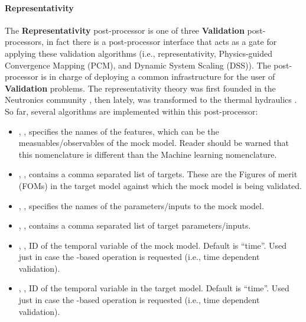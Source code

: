 \paragraph{Representativity}
The \textbf{Representativity} post-processor is one of three \textbf{Validation} post-processors, in fact there is a
post-processor interface that acts as a gate for applying these validation algorithms
(i.e., representativity, Physics-guided Convergence Mapping (PCM), and Dynamic System Scaling (DSS)).
The post-processor is in charge of deploying a common infrastructure for the user of  \textbf{Validation} problems.
The representativity theory was first founded in the
Neutronics community \cite{Gandini, palmiotti1, palmiotti2}, then lately, was transformed to the thermal hydraulics \cite{Epiney1, Epiney2}. So far, several algorithms are implemented within this post-processor:
%
%

\begin{itemize}
  \item {}, , specifies the names of  the features, which can be the measuables/observables of the mock model. Reader should be warned that this nomenclature is different than the Machine learning nomenclature.

  \item {}, , contains a comma separated list of
     targets. These are the Figures of merit (FOMs) in the target model against which the mock model is being validated.

    \item {}, , specifies the names of  the parameters/inputs to the mock model.

    \item {}, , contains a comma separated list of
    target parameters/inputs.

        \item {},  , ID of the temporal variable of the mock model. Default is ``time''.
        \nb Used just in case the  -based operation  is requested (i.e., time dependent validation).
        \item {}, , ID of the temporal variable in the target model. Default is ``time''.
        \nb Used just in case the  -based operation  is requested (i.e., time dependent validation).
\end{itemize}


